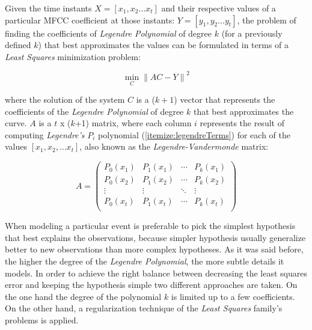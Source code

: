Given the time instants $X=[x_{1}, x_{2} \dotsc x_{t}]$ and their respective values of a particular
MFCC coefficient at those instants: $Y=[y_{1}, y_{2} \dotsc y_{t}]$,
the problem of finding the coefficients of \textit{Legendre Polynomial} of degree $k$
(for a previously defined $k$) that best approximates
the values can be formulated in terms of a \textit{Least Squares} minimization problem:

\begin{equation}
  \min_{C} {\| AC - Y \|}^{2}
\end{equation}

where the solution of the system $C$ is a ($k+1$) vector that represents the coefficients
of the \textit{Legendre Polynomial} of degree $k$ that best approximates the curve.
$A$ is a $t$ x ($k$+1) matrix, where each column $i$ represents the result of computing
\textit{Legendre's} $P_{i}$ polynomial (\ref{itemize:legendreTerms}) for each of the values
$[x_{1}, x_{2}, \dotsc x_{t}]$, also known as the \textit{Legendre-Vandermonde} matrix:

\begin{equation}
  A =
    \begin{pmatrix}
      P_{0}(x_{1}) & P_{1}(x_{1}) & \cdots & P_{k}(x_{1}) \\
      P_{0}(x_{2}) & P_{1}(x_{2}) & \cdots & P_{k}(x_{2}) \\
      \vdots & \vdots & \ddots & \vdots \\
      P_{0}(x_{t}) & P_{1}(x_{t}) & \cdots & P_{k}(x_{t}) \\
    \end{pmatrix}
\end{equation}

When modeling a particular event is preferable to pick the simplest hypothesis that best
explains the observations, because simpler hypothesis usually generalize better to new
observations than more complex hypotheses. As it was said before, the higher the
degree of the \textit{Legendre Polynomial},
the more subtle details it models. In order to achieve the right balance between decreasing
the least squares error and keeping the hypothesis simple two different approaches are taken.
On the one hand the degree of the polynomial $k$ is limited up to a few coefficients.
On the other hand, a regularization technique of the \textit{Least Squares} family's
problems is applied.

